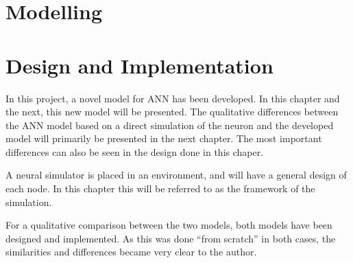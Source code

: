 \documentclass[b5paper,11 pt]{report}
\begin{document}
	


\chapter{Modelling} 				%
	
	
\chapter{Design and Implementation} %
	In this project, a novel model for ANN has been developed.  %
	In this chapter and the next, this new model will be presented.  %
	The qualitative differences between the ANN model based on a direct simulation of the neuron and the developed model will primarily be presented in the next chapter.
	The most important differences can also be seen in the design done in this chaper. %

	A neural simulator is placed in an environment, and will have a general design of each node. 
	In this chapter this will be referred to as the framework of the simulation.
	
	For a qualitative comparison between the two models, both models have been designed and implemented. %
	As this was done ``from scratch'' in both cases, the similarities and differences became very clear to the author. %
\end{document}
